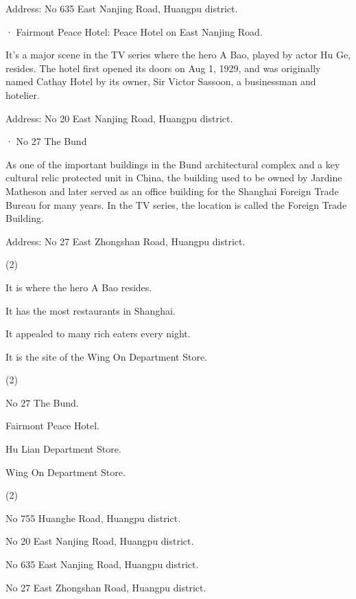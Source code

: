 \documentclass{英语试卷}
\begin{document}
\par Address: No 635 East Nanjing Road, Huangpu district.\par
\par · Fairmont Peace Hotel: Peace Hotel on East Nanjing Road.\par
\par It's a major scene in the TV series where the hero A Bao, played by actor Hu Ge, resides. The hotel first opened its doors on Aug 1, 1929, and was originally named Cathay Hotel by its owner, Sir Victor Sassoon, a businessman and hotelier.\par
\par Address: No 20 East Nanjing Road, Huangpu district.\par
\par · No 27 The Bund\par
\par As one of the important buildings in the Bund architectural complex and a key cultural relic protected unit in China, the building used to be owned by Jardine Matheson and later served as an office building for the Shanghai Foreign Trade Bureau for many years. In the TV series, the location is called the Foreign Trade Building.\par
\par Address: No 27 East Zhongshan Road, Huangpu district.\par
{}
\begin{choices}(2)
  \item It is where the hero A Bao resides.
  \item It has the most restaurants in Shanghai.
  \item It appealed to many rich eaters every night.
  \item It is the site of the Wing On Department Store.
\end{choices}
\begin{choices}(2)
  \item No 27 The Bund.
  \item Fairmont Peace Hotel.
  \item Hu Lian Department Store.
  \item Wing On Department Store.
\end{choices}
\begin{choices}(2)
  \item No 755 Huanghe Road, Huangpu district.
  \item No 20 East Nanjing Road, Huangpu district.
  \item No 635 East Nanjing Road, Huangpu district.
  \item No 27 East Zhongshan Road, Huangpu district.
\end{choices}
\end{document}
